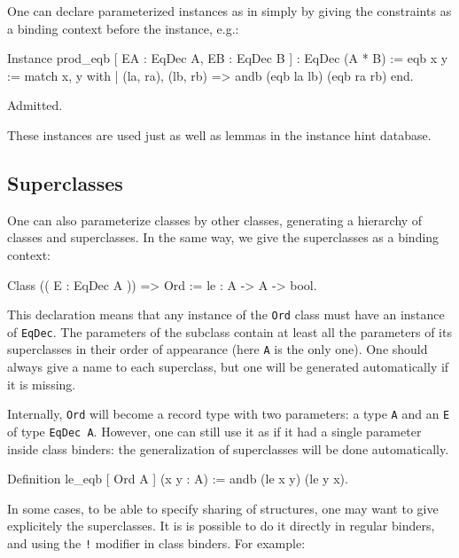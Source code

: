 
One can declare parameterized instances as in \Haskell simply by giving
the constraints as a binding context before the instance, e.g.:

\begin{coq_example}
Instance prod_eqb [ EA : EqDec A, EB : EqDec B ] : EqDec (A * B) :=
  eqb x y := match x, y with
  | (la, ra), (lb, rb) => andb (eqb la lb) (eqb ra rb)
  end.
\end{coq_example}
\begin{coq_eval}
Admitted.
\end{coq_eval}

These instances are used just as well as lemmas in the instance hint database.


\subsection{Superclasses}
\label{classes:superclasses}
One can also parameterize classes by other classes, generating a
hierarchy of classes and superclasses. In the same way, we give the
superclasses as a binding context:

\begin{coq_example}
Class (( E : EqDec A )) => Ord :=
  le : A -> A -> bool.
\end{coq_example}

This declaration means that any instance of the \texttt{Ord} class must
have an instance of \texttt{EqDec}. The parameters of the subclass contain
at least all the parameters of its superclasses in their order of
appearance (here \texttt{A} is the only one). One should always give a
name to each superclass, but one will be generated automatically if it
is missing.

Internally, \texttt{Ord} will become a record type with two parameters:
a type \texttt{A} and an \texttt{E} of type \texttt{EqDec A}. However, one can
still use it as if it had a single parameter inside class binders: the
generalization of superclasses will be done automatically. 
\begin{coq_example}
Definition le_eqb [ Ord A ] (x y : A) :=
  andb (le x y) (le y x).
\end{coq_example}

In some cases, to be able to specify sharing of structures, one may want to give
explicitely the superclasses. It is is possible to do it directly in regular
binders, and using the \texttt{!} modifier in class binders. For
example:

